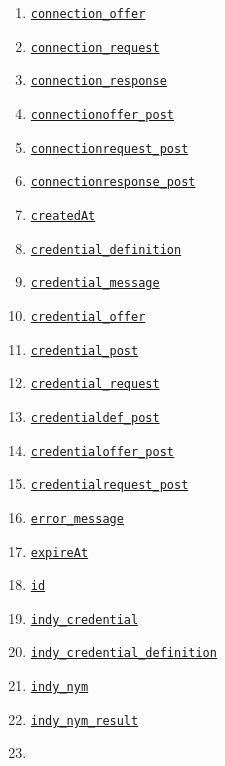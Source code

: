 \begin{enumerate}
\tightlist
\item
  \protect\hyperlink{connection_offer}{\texttt{connection\_offer}}
\item
  \protect\hyperlink{connection_request}{\texttt{connection\_request}}
\item
  \protect\hyperlink{connection_response}{\texttt{connection\_response}}
\item
  \protect\hyperlink{connectionoffer_post}{\texttt{connectionoffer\_post}}
\item
  \protect\hyperlink{connectionrequest_post}{\texttt{connectionrequest\_post}}
\item
  \protect\hyperlink{connectionresponse_post}{\texttt{connectionresponse\_post}}
\item
  \protect\hyperlink{createdAt}{\texttt{createdAt}}
\item
  \protect\hyperlink{credential_definition}{\texttt{credential\_definition}}
\item
  \protect\hyperlink{credential_message}{\texttt{credential\_message}}
\item
  \protect\hyperlink{credential_offer}{\texttt{credential\_offer}}
\item
  \protect\hyperlink{credential_post}{\texttt{credential\_post}}
\item
  \protect\hyperlink{credential_request}{\texttt{credential\_request}}
\item
  \protect\hyperlink{credentialdef_post}{\texttt{credentialdef\_post}}
\item
  \protect\hyperlink{credentialoffer_post}{\texttt{credentialoffer\_post}}
\item
  \protect\hyperlink{credentialrequest_post}{\texttt{credentialrequest\_post}}
\item
  \protect\hyperlink{error_message}{\texttt{error\_message}}
\item
  \protect\hyperlink{expireAt}{\texttt{expireAt}}
\item
  \protect\hyperlink{id}{\texttt{id}}
\item
  \protect\hyperlink{indy_credential}{\texttt{indy\_credential}}
\item
  \protect\hyperlink{indy_credential_definition}{\texttt{indy\_credential\_definition}}
\item
  \protect\hyperlink{indy_nym}{\texttt{indy\_nym}}
\item
  \protect\hyperlink{indy_nym_result}{\texttt{indy\_nym\_result}}
\item

\end{enumerate}
